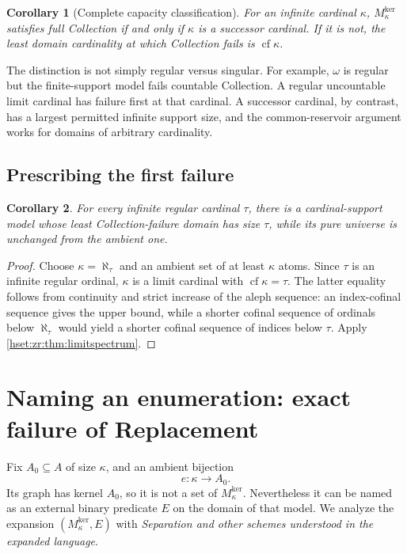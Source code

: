 \documentclass[11pt,letterpaper]{article}
\newtheorem{corollary}[corollary]{Corollary}\aliascntresetthe{corollary}
\theoremstyle{definition}
\theoremstyle{remark}
\newcommand{\cf}{\operatorname{cf}}
\newcommand{\Mker}{M^{\mathrm{ker}}}
\begin{document}
\begin{corollary}[Complete capacity classification]
\label{hset:zr:cor:classification}
For an infinite cardinal $\kappa$, $\Mker_\kappa$ satisfies full Collection if and only if $\kappa$ is a successor cardinal. If it is not, the least domain cardinality at which Collection fails is $\cf\kappa$.
\end{corollary}

The distinction is not simply regular versus singular. For example, $\omega$ is regular but the finite-support model fails countable Collection. A regular uncountable limit cardinal has failure first at that cardinal. A successor cardinal, by contrast, has a largest permitted infinite support size, and the common-reservoir argument works for domains of arbitrary cardinality.

\subsection{Prescribing the first failure}
\begin{corollary}
\label{hset:zr:cor:arbitrarythreshold}
For every infinite regular cardinal $\tau$, there is a cardinal-support model whose least Collection-failure domain has size $\tau$, while its pure universe is unchanged from the ambient one.
\end{corollary}
\begin{proof}
Choose $\kappa=\aleph_\tau$ and an ambient set of at least $\kappa$ atoms. Since $\tau$ is an infinite regular ordinal, $\kappa$ is a limit cardinal with $\cf\kappa=\tau$. The latter equality follows from continuity and strict increase of the aleph sequence: an index-cofinal sequence gives the upper bound, while a shorter cofinal sequence of ordinals below $\aleph_\tau$ would yield a shorter cofinal sequence of indices below $\tau$. Apply \cref{hset:zr:thm:limitspectrum}.
\end{proof}

\section{Naming an enumeration: exact failure of Replacement}
\label{hset:zr:sec:expansion}

Fix $A_0\subseteq A$ of size $\kappa$, and an ambient bijection
\[
e:\kappa\longrightarrow A_0.
\]
Its graph has kernel $A_0$, so it is not a set of $\Mker_\kappa$. Nevertheless it can be named as an external binary predicate $E$ on the domain of that model. We analyze the expansion $(\Mker_\kappa,E)$ with \emph{Separation and other schemes understood in the expanded language}.
\end{document}
